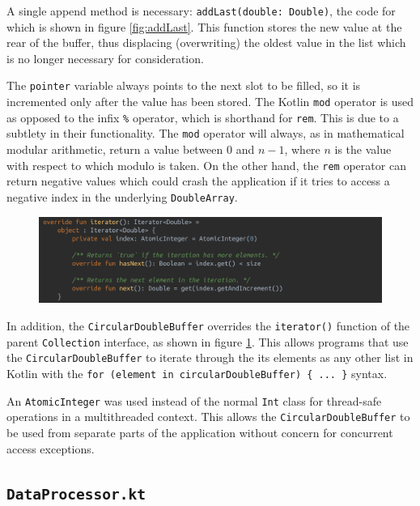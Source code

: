 \documentclass[11pt,twoside,a4paper]{report}
\begin{document}
A single append method is necessary: \texttt{addLast(double: Double)}, the code for which is shown in figure \ref{fig:addLast}. This function stores the new value at the rear of the buffer, thus displacing (overwriting) the oldest value in the list which is no longer necessary for consideration. 

The \texttt{pointer} variable always points to the next slot to be filled, so it is incremented only after the value has been stored. The Kotlin \texttt{mod} operator is used as opposed to the infix \texttt{\%} operator, which is shorthand for \texttt{rem}. This is due to a subtlety in their functionality. The \texttt{mod} operator will always, as in mathematical modular arithmetic, return a value between $0$ and $n-1$, where $n$ is the value with respect to which modulo is taken. On the other hand, the \texttt{rem} operator can return negative values which could crash the application if it tries to access a negative index in the underlying \texttt{DoubleArray}.

\begin{figure}[h!]
  \centering
  \includegraphics[width=1.0\textwidth]{code-CircularDoubleBuffer-iterator.png}
  \caption{}
  \label{fig:iterator}
\end{figure}

In addition, the \texttt{CircularDoubleBuffer} overrides the \texttt{iterator()} function of the parent \texttt{Collection} interface, as shown in figure \ref{fig:iterator}. This allows programs that use the \texttt{CircularDoubleBuffer} to iterate through the its elements as any other list in Kotlin with the \texttt{for (element in circularDoubleBuffer) \{ ... \}} syntax. 

An \texttt{AtomicInteger} was used instead of the normal \texttt{Int} class for thread-safe operations in a multithreaded context. This allows the \texttt{CircularDoubleBuffer} to be used from separate parts of the application without concern for concurrent access exceptions.

\subsection{\texttt{DataProcessor.kt}}
\end{document}

